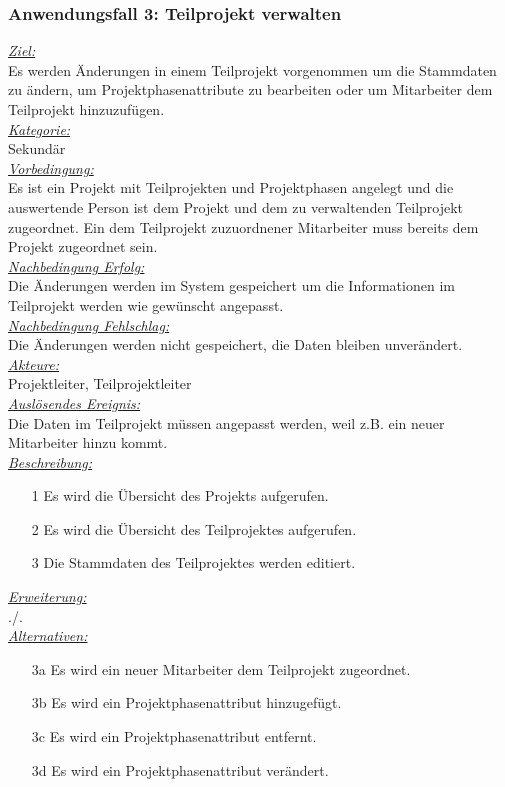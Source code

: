 \subsubsection{Anwendungsfall 3: Teilprojekt verwalten}
\underline{\emph{Ziel:}}\\
Es werden Änderungen in einem Teilprojekt vorgenommen um die Stammdaten zu ändern, um Projektphasenattribute zu bearbeiten oder um Mitarbeiter dem Teilprojekt hinzuzufügen.\\
\underline{\emph{Kategorie:}} \\
Sekundär\\
\underline{\emph{Vorbedingung:}} \\
Es ist ein Projekt mit Teilprojekten und Projektphasen angelegt und die auswertende Person ist dem Projekt und dem zu verwaltenden Teilprojekt zugeordnet. Ein dem Teilprojekt zuzuordnener Mitarbeiter muss bereits dem Projekt zugeordnet sein.\\
\underline{\emph{Nachbedingung Erfolg:}} \\
Die Änderungen werden im System gespeichert um die Informationen im Teilprojekt werden wie gewünscht angepasst.\\
\underline{\emph{Nachbedingung Fehlschlag:}} \\
Die Änderungen werden nicht gespeichert, die Daten bleiben unverändert.\\
\underline{\emph{Akteure:}} \\
Projektleiter, Teilprojektleiter\\
\underline{\emph{Auslösendes Ereignis:}}\\
Die Daten im Teilprojekt müssen angepasst werden, weil z.B. ein neuer Mitarbeiter hinzu kommt.\\
\underline{\emph{Beschreibung:}} 
\begin{itemize}
    \item [1] Es wird die Übersicht des Projekts aufgerufen.
    \item [2] Es wird die Übersicht des Teilprojektes aufgerufen.
    \item [3] Die Stammdaten des Teilprojektes werden editiert.
\end{itemize}
\underline{\emph{Erweiterung:}}\\
./.\\
\underline{\emph{Alternativen:}}
\begin{itemize}
    \item [3a] Es wird ein neuer Mitarbeiter dem Teilprojekt zugeordnet.
    \item [3b] Es wird ein Projektphasenattribut hinzugefügt. 
    \item [3c] Es wird ein Projektphasenattribut entfernt.
    \item [3d] Es wird ein Projektphasenattribut verändert.
\end{itemize}

